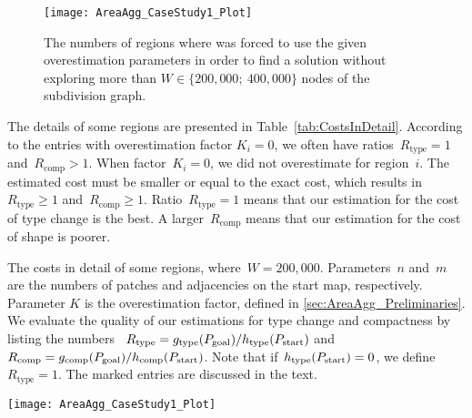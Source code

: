 \documentclass[acmsmall,natbib=false]{acmart}
\begin{document}
\begin{figure}[tb]
\centering
\texttt{[image: AreaAgg\_CaseStudy1\_Plot]}
\caption{The numbers of regions where \Astar was 
	forced to use the given overestimation parameters
	in order to find a solution 
	without exploring more than 
	$W \in \{200{,}000;~400{,}000\}$ 
	nodes of the subdivision graph.}
\label{fig:AreaAgg_OverStats}
\end{figure}

The details of some regions are presented in 
Table~\ref{tab:CostsInDetail}.
According to the entries with overestimation factor $K_i=0$, 
we often have 
ratios~$R_\mathrm{type}=1$ and~$R_\mathrm{comp}>1$.
When factor~$K_i=0$, we did not overestimate for region~$i$.
The estimated cost must be smaller or equal to the exact cost,
which results in~$R_\mathrm{type}\ge 1$ 
and~$R_\mathrm{comp}\ge 1$.
Ratio~$R_\mathrm{type} = 1$ means that our estimation for the 
cost of type change is the best.
A larger~$R_\mathrm{comp}$ means that our estimation for the 
cost of shape is poorer.

\begin{table*}[tb]
\caption{The costs in detail of some regions, 
	where~$W=200{,}000$.  
	Parameters~$n$ and~$m$ are the numbers of patches and 
	adjacencies on the start map, respectively.
	Parameter $K$ is the overestimation factor, 
	defined in \sect\ref{sec:AreaAgg_Preliminaries}. 
	We evaluate the quality 
	of our estimations for type change and 
	compactness by listing the numbers~
	$R_\mathrm{type}=g_\mathrm{type}(P_\mathrm{goal})
	/h_\mathrm{type}(P_\mathrm{start})$ and~
	$R_\mathrm{comp}=g_\mathrm{comp}(P_\mathrm{goal})
	/h_\mathrm{comp}(P_\mathrm{start})$. 
	Note that if~$h_\mathrm{type}(P_\mathrm{start})=0$, 
	we define~$R_\mathrm{type}=1$.
	The marked entries are discussed in the text.
}
\label{tab:CostsInDetail}
\centering
\texttt{[image: AreaAgg\_CaseStudy1\_Plot]}
\end{table*}
\end{document}

